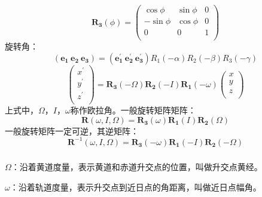 \begin{equation}
	\boldsymbol{R_{3}}(\phi)=\begin{pmatrix}
		\cos \phi &\sin \phi &0\\
		-\sin \phi &\cos \phi &0\\
		0&0&1\\
	\end{pmatrix}
\end{equation}
旋转角：
\begin{equation}
	(\boldsymbol{e_{1}} \ \boldsymbol{e_{2}} \ \boldsymbol{e_{3}})=(\boldsymbol{e_{1}^\prime} \ \boldsymbol{e_{2}^\prime}  \ \boldsymbol{e_{3}^\prime}){R_{1}}(-\alpha){R_{2}}(-\beta){R_{3}}(-\gamma)
\end{equation}
\begin{equation}
	\begin{pmatrix}
		x^\prime\\
		y^\prime \\
		z^\prime \\
	\end{pmatrix}
=\boldsymbol{R_{3}}(-\Omega)\boldsymbol{R_{2}}(-I)\boldsymbol{R_{1}}(-\omega)
\begin{pmatrix}
	x\\
	y\\
	z\\
\end{pmatrix}	
\end{equation}
上式中，$\Omega$，$I$，$\omega$称作欧拉角。一般旋转矩阵矩阵：
\begin{equation}
	\boldsymbol{R}(\omega,I,\Omega)=\boldsymbol{R_{3}}(\omega)\boldsymbol{R_{1}}(I)\boldsymbol{R_{2}}(\Omega)
\end{equation}
一般旋转矩阵一定可逆，其逆矩阵：
\begin{equation}
	\boldsymbol{R}^{-1}(\omega,I,\Omega)=\boldsymbol{R_{3}}(-\omega)\boldsymbol{R_{1}}(-I)\boldsymbol{R_{2}}(-\Omega)
\end{equation}
\subparagraph{}
$\Omega$：沿着黄道度量，表示黄道和赤道升交点的位置，叫做升交点黄经。

$\omega$：沿着轨道度量，表示升交点到近日点的角距离，叫做近日点幅角。

